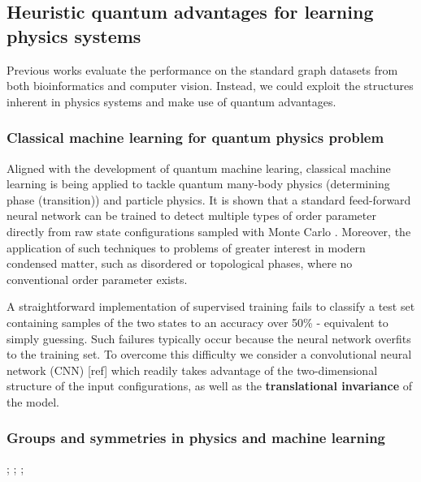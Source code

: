 \subsection{Heuristic quantum advantages for learning physics systems}
Previous works evaluate the performance on the standard graph datasets from both bioinformatics and computer vision.
Instead, we could exploit the structures inherent in physics systems and make use of quantum advantages.

\subsubsection{Classical machine learning for quantum physics problem}
Aligned with the development of quantum machine learing, classical machine learning is being applied to tackle quantum many-body physics (determining phase (transition)) and particle physics.
It is shown that a standard feed-forward neural network can be trained to detect multiple types of order parameter directly from raw state configurations sampled with Monte Carlo \cite{carrasquillaMachineLearningPhases2017}.
Moreover, the application of such techniques to problems of greater interest in modern condensed matter, such as disordered or topological phases, where no conventional order parameter exists.
\cite{carleoSolvingQuantumManyBody2017}
\begin{remark}
	A straightforward implementation of supervised training fails to classify a test set containing samples of the two states to an accuracy over 50\% - equivalent to simply guessing. Such failures typically occur because the neural network overfits to the training set. 
	To overcome this difficulty we consider a convolutional neural network (CNN) [ref] which readily takes advantage of the two-dimensional structure of the input conﬁgurations, as well as the \textbf{translational invariance} of the model.
\end{remark}

\subsubsection{Groups and symmetries in physics and machine learning}
\cite{kondorGroupTheoreticalMethods2008};
\cite{bogatskiyLorentzGroupEquivariant2020};
\cite{bogatskiySymmetryGroupEquivariant2022};

